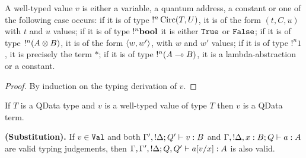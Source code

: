 \documentclass[twoside]{article}
\begin{document}
\begin{lemma}
\label{form_values}
A well-typed value $v$ is either a variable, a quantum address, a constant or one 
of the following case occurs: if it is of type $!^n\mathop{\textrm{Circ}}\nolimits(T,U)$, it is of the 
form $(t,C,u)$ with $t$ and $u$ values; if it is of type $!^n\textrm{\bf bool}$ it is either 
$\texttt{True}$ or $\texttt{False}$; if it is of type $!^n (A\otimes B)$, it is of the
form $\langle w,w'\rangle$, with $w$ and $w'$ values; if it is of type $!^n1$, it is 
precisely the term $*$; if it is of type $!^n (A\multimap B)$, it is a 
lambda-abstraction or a constant.
\end{lemma}

\begin{proof}
By induction on the typing derivation of $v$.
\end{proof}

\begin{corollary}
\label{typed_qd_term}
If $T$ is a QData type and $v$ is a well-typed value of type $T$ then $v$ is 
a QData term.
\end{corollary}

\begin{lemma}
{\bf (Substitution).}
\label{substitution}
If $v\in\mathtt{Val}$ and both $\Gamma',!\Delta;Q' \vdash v:B$ and 
$\Gamma,!\Delta,x:B;Q \vdash a:A$ are valid typing judgements, 
then $\Gamma,\Gamma',!\Delta;Q,Q' \vdash a[v/x]:A$ is also valid.
\end{lemma}
\end{document}
